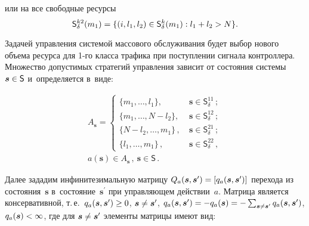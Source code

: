 \begin{multicols}{2}
\vspace*{-5pt}

\noindent
или на все свободные ресурсы 
$$
\mathsf{S}_\delta^{k2}(m_1)\hm= \{( i,l_1,l_2)\hm\in \mathsf{S}_\delta^k(m_1): 
l_1\hm+l_2\hm> N\}.
$$

  
  Задачей управления системой массового обслуживания будет выбор нового 
объема ресурса для 1-го класса трафика при поступлении сигнала конт\-рол\-ле\-ра. 
Множество допустимых стратегий управ\-ле\-ния зависит от состояния системы 
$\bm{s}\hm\in \mathsf{S}$ и~определяется в~виде:

\vspace*{-4pt}

\noindent
  \begin{multline*}
  A_{\bm{s}}= \left\{
  \begin{array}{ll}
  \{m_1,\ldots , l_1\}, &\ \bm{s}\in \mathsf{S}_\delta^{11}\,;\\[3pt]
  \{m_1,\ldots , N-l_2\}, &\ \bm{s}\in \mathsf{S}_\delta^{12}\,;\\[3pt]
  \{N-l_2,\ldots , m_1\}\,,&\ \bm{s}\in \mathsf{S}_\delta^{21}\,;\\[3pt]
  \{l_1, \ldots , m_1\}\,,&\ \bm{s}\in \mathsf{S}_\delta^{22}\,,
  \end{array}
  \right.\\
   a(\bm{s})\in A_{\bm{s}}\,,\ \bm{s}\in \mathsf{S}\,.
  \end{multline*}
    
    
    \vspace*{-3pt}
    
  Далее зададим инфинитезимальную матрицу $Q_a(\bm{s},\bm{s}^\prime) 
\hm= \left[ q_a (\bm{s},\bm{s}^\prime)\right]$ перехода из состояния~$\bm{s}$ 
в~состояние~$\bm{s}^\prime$ при управляющем действии~$a$. Матрица 
является консервативной, т.\,е.\ $q_a(\bm{s},\bm{s}^\prime) \hm\geq0$, 
$\bm{s}\hm\not= \bm{s}^\prime$, $q_a(\bm{s},\bm{s}^\prime) \hm= -q_a(\bm{s})\hm= -
\sum\nolimits_{\bm{s}\not= \bm{s}^\prime} q_a (\bm{s},\bm{s}^\prime)$, 
$q_a(\bm{s})\hm<\infty$, где для $\bm{s}\hm\not= \bm{s}^\prime$ элементы 
матрицы имеют вид:

\pagebreak


\end{multicols}
